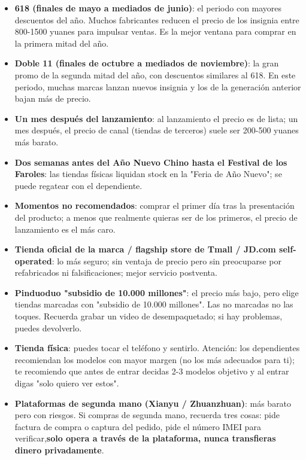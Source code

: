 \begin{itemize}
  \item \textbf{618 (finales de mayo a mediados de junio)}: el periodo con mayores descuentos del año. Muchos fabricantes reducen el precio de los insignia entre 800-1500 yuanes para impulsar ventas. Es la mejor ventana para comprar en la primera mitad del año.
  \item \textbf{Doble 11 (finales de octubre a mediados de noviembre)}: la gran promo de la segunda mitad del año, con descuentos similares al 618. En este periodo, muchas marcas lanzan nuevos insignia y los de la generación anterior bajan más de precio.
  \item \textbf{Un mes después del lanzamiento}: al lanzamiento el precio es de lista; un mes después, el precio de canal (tiendas de terceros) suele ser 200-500 yuanes más barato.
  \item \textbf{Dos semanas antes del Año Nuevo Chino hasta el Festival de los Faroles}: las tiendas físicas liquidan stock en la "Feria de Año Nuevo"; se puede regatear con el dependiente.
  \item \textbf{Momentos no recomendados}: comprar el primer día tras la presentación del producto; a menos que realmente quieras ser de los primeros, el precio de lanzamiento es el más caro.
\end{itemize}


\begin{itemize}
  \item \textbf{Tienda oficial de la marca / flagship store de Tmall / JD.com self-operated}: lo más seguro; sin ventaja de precio pero sin preocuparse por refabricados ni falsificaciones; mejor servicio postventa.
  \item \textbf{Pinduoduo "subsidio de 10.000 millones"}: el precio más bajo, pero elige tiendas marcadas con "subsidio de 10.000 millones". Las no marcadas no las toques. Recuerda grabar un video de desempaquetado; si hay problemas, puedes devolverlo.
  \item \textbf{Tienda física}: puedes tocar el teléfono y sentirlo. Atención: los dependientes recomiendan los modelos con mayor margen (no los más adecuados para ti); te recomiendo que antes de entrar decidas 2-3 modelos objetivo y al entrar digas "solo quiero ver estos".
  \item \textbf{Plataformas de segunda mano (Xianyu / Zhuanzhuan)}: más barato pero con riesgos. Si compras de segunda mano, recuerda tres cosas: pide factura de compra o captura del pedido, pide el número IMEI para verificar,\textbf{solo opera a través de la plataforma, nunca transfieras dinero privadamente}.
\end{itemize}

